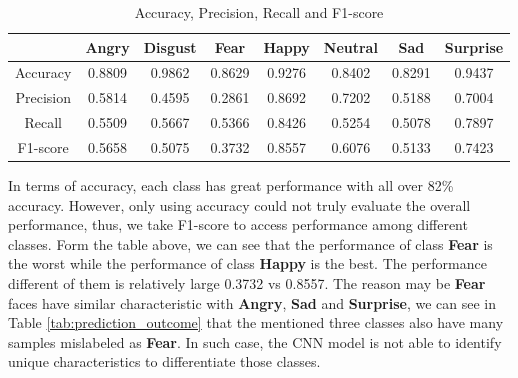\documentclass[11pt,a4paper]{article}
\begin{document}
    \begin{table}[H]
        \centering
        \begin{tabular}{c|c|c|c|c|c|c|c}
             & Angry & Disgust & Fear & Happy & Neutral & Sad & Surprise \\ \hline \hline
            Accuracy & 0.8809 &  0.9862 &  0.8629 &  0.9276 &  0.8402 &  0.8291 &  0.9437 \\ \hline
            Precision & 0.5814 &  0.4595 &  0.2861 &  0.8692 &  0.7202 &  0.5188 &  0.7004 \\ \hline
            Recall & 0.5509 &  0.5667 &  0.5366 &  0.8426 &  0.5254 &  0.5078 &  0.7897 \\ \hline
            F1-score & 0.5658 &  0.5075 &  0.3732 &  0.8557 &  0.6076 &  0.5133 &  0.7423 \\
        \end{tabular}
        \caption{Accuracy, Precision, Recall and F1-score}
        \label{tab:score}
    \end{table}
    \noindent
    In terms of accuracy, each class has great performance with all over 82\% accuracy. However, only using accuracy could not truly evaluate the overall performance, thus, we take F1-score to access performance among different classes. Form the table above, we can see that the performance of class \textbf{Fear} is the worst while the performance of class \textbf{Happy} is the best. The performance different of them is relatively large 0.3732 vs 0.8557. The reason may be \textbf{Fear} faces have similar characteristic with \textbf{Angry}, \textbf{Sad} and \textbf{Surprise}, we can see in Table \ref{tab:prediction_outcome} that the mentioned three classes also have many samples mislabeled as \textbf{Fear}. In such case, the CNN model is not able to identify unique characteristics to differentiate those classes.
    
\end{document}
